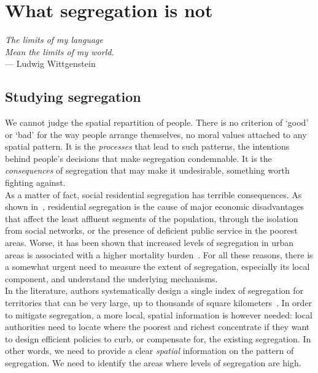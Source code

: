 \chapter{What segregation is not}
\label{chap:segregation_introduction}

\begin{flushright}{\slshape    
The limits of my language\\
Mean the limits of my world.} \\ \medskip
--- Ludwig Wittgenstein~\cite{Wittgenstein:1998}
\end{flushright}


\bigskip


\newcommand{\E}{\mathrm{E}}
\newcommand{\Var}{\mathrm{Var}}

\section{Studying segregation}
\label{sec:studying_segregation}


We cannot judge the spatial repartition of people. There is no criterion of
`good' or `bad' for the way people arrange themselves, no moral values attached
to any spatial pattern. It is the \emph{processes} that lead to such patterns,
the intentions behind people's decisions that make segregation condemnable. It
is the \emph{consequences} of segregation that may make it undesirable, something
worth fighting against.\\

As a matter of fact, social residential segregation has terrible consequences.
As shown in~\cite{Massey:1993}, residential segregation is the cause of major
economic disadvantages that affect the least affluent segments of the
population, through the isolation from social networks, or the presence of
deficient public service in the poorest areas. Worse, it has been shown that
increased levels of segregation in urban areas is associated with a higher
mortality burden~\cite{Lobmayer:2002}. For all these reasons, there is a
somewhat urgent need to measure the extent of segregation, especially its local
component, and understand the underlying mechanisms.\\

In the literature, authors systematically design a single index of segregation for
territories that can be very large, up to thousands of square
kilometers~\cite{Apparicio:2000}. In order to mitigate segregation, a more
local, spatial information is however needed: local authorities need to locate
where the poorest and richest concentrate if they want to design efficient
policies to curb, or compensate for, the existing segregation. In other words,
we need to provide a clear {\it spatial} information on the pattern of
segregation. We need to identify the areas where levels of segregation are high.

